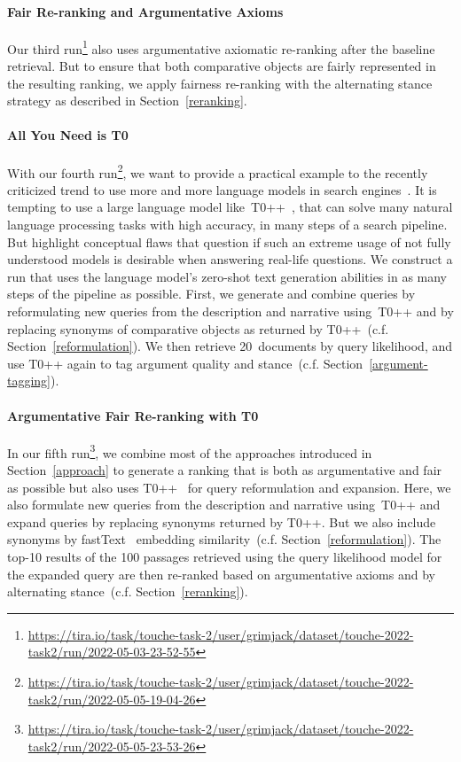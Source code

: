 \paragraph{Fair Re-ranking and Argumentative Axioms}

Our third run\footnote{\url{https://tira.io/task/touche-task-2/user/grimjack/dataset/touche-2022-task2/run/2022-05-03-23-52-55}} also uses argumentative axiomatic re-ranking after the baseline retrieval. But to ensure that both comparative objects are fairly represented in the resulting ranking, we apply fairness re-ranking with the alternating stance strategy as described in Section~\ref{reranking}.

\paragraph{All You Need is T0}

With our fourth run\footnote{\url{https://tira.io/task/touche-task-2/user/grimjack/dataset/touche-2022-task2/run/2022-05-05-19-04-26}}, we want to provide a practical example to the recently criticized trend to use more and more language models in search engines~\cite{ShahB2022}.
It is tempting to use a large language model like~T0++~\cite{SanhWRBSACSLRDBXTSSKCNDCJWMSYPBWNRSSFFTBGBWR2021}, that can solve many natural language processing tasks with high accuracy, in many steps of a search pipeline. But \citet{ShahB2022} highlight conceptual flaws that question if such an extreme usage of not fully understood models is desirable when answering real-life questions.
We construct a run that uses the language model's zero-shot text generation abilities in as many steps of the pipeline as possible.
First, we generate and combine queries by reformulating new queries from the description and narrative using~T0++ and by replacing synonyms of comparative objects as returned by T0++~(c.f. Section~\ref{reformulation}).
We then retrieve 20~documents by query likelihood, and use T0++ again to tag argument quality and stance~(c.f. Section~\ref{argument-tagging}).

\paragraph{Argumentative Fair Re-ranking with T0}

In our fifth run\footnote{\url{https://tira.io/task/touche-task-2/user/grimjack/dataset/touche-2022-task2/run/2022-05-05-23-53-26}}, we combine most of the approaches introduced in Section~\ref{approach} to generate a ranking that is both as argumentative and fair as possible but also uses T0++~\cite{SanhWRBSACSLRDBXTSSKCNDCJWMSYPBWNRSSFFTBGBWR2021} for query reformulation and expansion.
Here, we also formulate new queries from the description and narrative using~T0++ and expand queries by replacing synonyms returned by T0++. But we also include synonyms by fastText~\cite{BojanowskiGJM2017} embedding similarity~(c.f. Section~\ref{reformulation}).
The top-10 results of the 100 passages retrieved using the query likelihood model for the expanded query are then re-ranked based on argumentative axioms and by alternating stance~(c.f. Section~\ref{reranking}).

